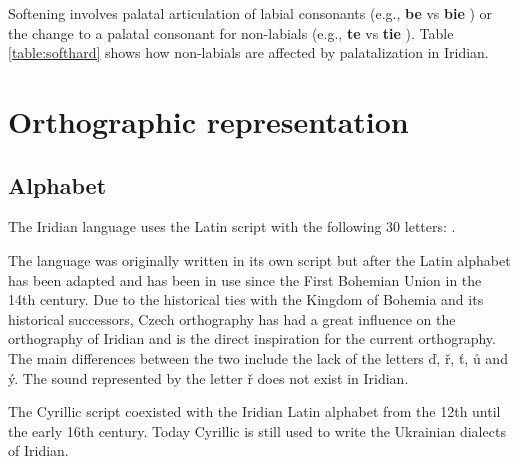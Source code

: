 \par Softening involves palatal articulation of labial consonants (e.g.,
\textbf{be} \textipa{[bE]} vs \textbf{bie} \textipa{[b\sx{j}E]}) or the change
to a palatal consonant for non-labials (e.g., \textbf{te} \textipa{[tE]} vs
\textbf{tie} \textipa{[cE]}). Table \ref{table:softhard} shows how non-labials
are affected by palatalization in Iridian.

\section{Orthographic representation}\label{sec:ortho}
\subsection{Alphabet}

\par The Iridian language uses the Latin script with the following 30 letters:
.

The language was originally written in its own script but after the Latin
alphabet has been adapted and has been in use since the First Bohemian Union in
the 14th century. Due to the historical ties with the Kingdom of Bohemia and its
historical successors, Czech orthography has had a great influence on the
orthography of Iridian and is the direct inspiration for the current
orthography. The main differences between the two include the lack of the
letters \v{d}, \v{r}, \v{t}, ů and \'y. The sound represented by the letter
\v{r} does not exist in Iridian.

The Cyrillic script coexisted with the Iridian Latin alphabet from the 12th
until the early 16th century. Today Cyrillic is still used to write the
Ukrainian dialects of Iridian.


